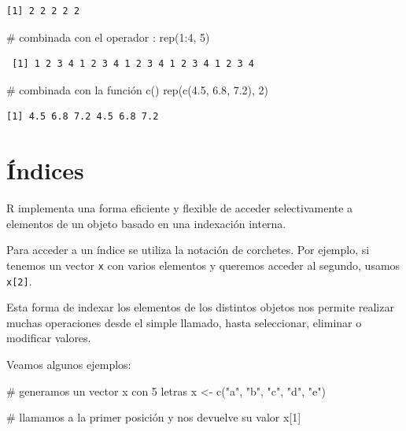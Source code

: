 \documentclass[
  spanish,
  letterpaper,
  DIV=11,
  numbers=noendperiod]{scrreprt}
\newenvironment{Shaded}{\begin{snugshade}}{\end{snugshade}}
\newcommand{\CommentTok}[1]{\textcolor[rgb]{0.37,0.37,0.37}{#1}}
\newcommand{\DecValTok}[1]{\textcolor[rgb]{0.68,0.00,0.00}{#1}}
\newcommand{\FloatTok}[1]{\textcolor[rgb]{0.68,0.00,0.00}{#1}}
\newcommand{\FunctionTok}[1]{\textcolor[rgb]{0.28,0.35,0.67}{#1}}
\newcommand{\NormalTok}[1]{\textcolor[rgb]{0.00,0.23,0.31}{#1}}
\newcommand{\OtherTok}[1]{\textcolor[rgb]{0.00,0.23,0.31}{#1}}
\newcommand{\SpecialCharTok}[1]{\textcolor[rgb]{0.37,0.37,0.37}{#1}}
\newcommand{\StringTok}[1]{\textcolor[rgb]{0.13,0.47,0.30}{#1}}
\begin{document}
\begin{verbatim}
[1] 2 2 2 2 2
\end{verbatim}

\begin{Shaded}
\begin{Highlighting}[]
\CommentTok{\# combinada con el operador :}
\FunctionTok{rep}\NormalTok{(}\DecValTok{1}\SpecialCharTok{:}\DecValTok{4}\NormalTok{, }\DecValTok{5}\NormalTok{)}
\end{Highlighting}
\end{Shaded}

\begin{verbatim}
 [1] 1 2 3 4 1 2 3 4 1 2 3 4 1 2 3 4 1 2 3 4
\end{verbatim}

\begin{Shaded}
\begin{Highlighting}[]
\CommentTok{\# combinada con la función c()}
\FunctionTok{rep}\NormalTok{(}\FunctionTok{c}\NormalTok{(}\FloatTok{4.5}\NormalTok{, }\FloatTok{6.8}\NormalTok{, }\FloatTok{7.2}\NormalTok{), }\DecValTok{2}\NormalTok{)}
\end{Highlighting}
\end{Shaded}

\begin{verbatim}
[1] 4.5 6.8 7.2 4.5 6.8 7.2
\end{verbatim}

\section{Índices}\label{uxedndices}

R implementa una forma eficiente y flexible de acceder selectivamente a
elementos de un objeto basado en una indexación interna.

Para acceder a un índice se utiliza la notación de corchetes. Por
ejemplo, si tenemos un vector \texttt{x} con varios elementos y queremos
acceder al segundo, usamos \texttt{x{[}2{]}}.

Esta forma de indexar los elementos de los distintos objetos nos permite
realizar muchas operaciones desde el simple llamado, hasta seleccionar,
eliminar o modificar valores.

Veamos algunos ejemplos:

\begin{Shaded}
\begin{Highlighting}[]
\CommentTok{\# generamos un vector x con 5 letras}
\NormalTok{x }\OtherTok{\textless{}{-}} \FunctionTok{c}\NormalTok{(}\StringTok{"a"}\NormalTok{, }\StringTok{"b"}\NormalTok{, }\StringTok{"c"}\NormalTok{, }\StringTok{"d"}\NormalTok{, }\StringTok{"e"}\NormalTok{)}

\CommentTok{\# llamamos a la primer posición y nos devuelve su valor}
\NormalTok{x[}\DecValTok{1}\NormalTok{]}
\end{Highlighting}
\end{Shaded}
\end{document}
